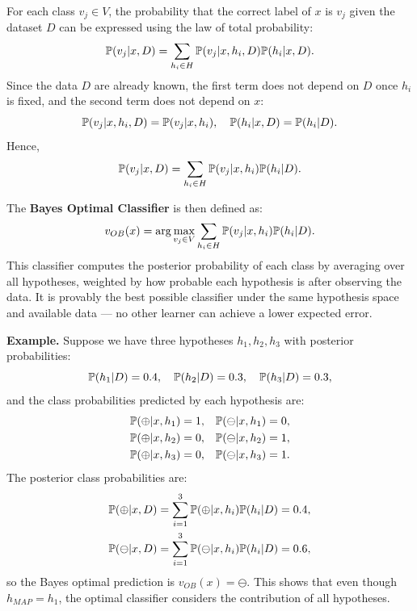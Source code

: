 \documentclass[10pt, letterpaper]{report}
\begin{document}
\bigskip
\noindent
For each class $v_j \in V$, the probability that the correct label of $x$ is $v_j$ given the dataset $D$ can be expressed using the law of total probability:
\begin{equation}
	{\mathbb P}(v_j|x,D) = \sum_{h_i \in H} {\mathbb P}(v_j|x,h_i,D) {\mathbb P}(h_i|x,D).
\end{equation}
Since the data $D$ are already known, the first term does not depend on $D$ once $h_i$ is fixed, and the second term does not depend on $x$:
\[
	{\mathbb P}(v_j|x,h_i,D) = {\mathbb P}(v_j|x,h_i), \quad {\mathbb P}(h_i|x,D) = {\mathbb P}(h_i|D).
\]
Hence,
\begin{equation}
	{\mathbb P}(v_j|x,D) = \sum_{h_i \in H} {\mathbb P}(v_j|x,h_i){\mathbb P}(h_i|D).
\end{equation}

\bigskip
\noindent
The \textbf{Bayes Optimal Classifier} is then defined as:
\begin{equation}
	v_{OB}(x) = \arg\max_{v_j \in V} \sum_{h_i \in H} {\mathbb P}(v_j|x,h_i){\mathbb P}(h_i|D).
\end{equation}
\newpage
This classifier computes the posterior probability of each class by averaging over all hypotheses, weighted by how probable each hypothesis is after observing the data.
It is provably the best possible classifier under the same hypothesis space and available data — no other learner can achieve a lower expected error.

\bigskip
\noindent
\textbf{Example.}
Suppose we have three hypotheses $h_1, h_2, h_3$ with posterior probabilities:
\[
	{\mathbb P}(h_1|D)=0.4, \quad {\mathbb P}(h_2|D)=0.3, \quad {\mathbb P}(h_3|D)=0.3,
\]
and the class probabilities predicted by each hypothesis are:
\begin{align*}
	{\mathbb P}(\oplus|x,h_1) & =1, & {\mathbb P}(\ominus|x,h_1) & =0, \\
	{\mathbb P}(\oplus|x,h_2) & =0, & {\mathbb P}(\ominus|x,h_2) & =1, \\
	{\mathbb P}(\oplus|x,h_3) & =0, & {\mathbb P}(\ominus|x,h_3) & =1.
\end{align*}
The posterior class probabilities are:
\begin{align*}
	{\mathbb P}(\oplus|x,D)  & = \sum_{i=1}^3 {\mathbb P}(\oplus|x,h_i){\mathbb P}(h_i|D) = 0.4,  \\
	{\mathbb P}(\ominus|x,D) & = \sum_{i=1}^3 {\mathbb P}(\ominus|x,h_i){\mathbb P}(h_i|D) = 0.6,
\end{align*}
so the Bayes optimal prediction is $v_{OB}(x) = \ominus$.
This shows that even though $h_{MAP}=h_1$, the optimal classifier considers the contribution of all hypotheses.
\end{document}
